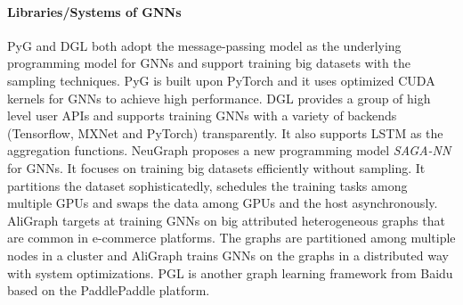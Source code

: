 \paragraph{Libraries/Systems of GNNs}

PyG \cite{PyG} and DGL \cite{DGL} both adopt the message-passing model as the underlying programming model for GNNs and support training big datasets with the sampling techniques.
PyG \cite{PyG} is built upon PyTorch and it uses optimized CUDA kernels for GNNs to achieve high performance.
DGL \cite{DGL} provides a group of high level user APIs and supports training GNNs with a variety of backends (Tensorflow, MXNet and PyTorch) transparently.
It also supports LSTM as the aggregation functions.
NeuGraph \cite{ma2019_neugraph} proposes a new programming model \emph{SAGA-NN} for GNNs.
It focuses on training big datasets efficiently without sampling.
It partitions the dataset sophisticatedly, schedules the training tasks among multiple GPUs and swaps the data among GPUs and the host asynchronously.
AliGraph \cite{zhu2019_aligraph} targets at training GNNs on big attributed heterogeneous graphs that are common in e-commerce platforms.
The graphs are partitioned among multiple nodes in a cluster and AliGraph trains GNNs on the graphs in a distributed way with system optimizations.
PGL \cite{pgl} is another graph learning framework from Baidu based on the PaddlePaddle platform.
